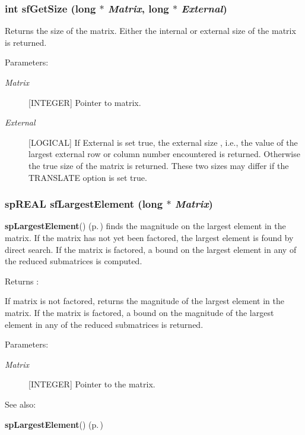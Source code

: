\subsubsection{\setlength{\rightskip}{0pt plus 5cm}int sf\-Get\-Size (long $\ast$ {\em Matrix}, long $\ast$ {\em External})}\label{spFortran_8c_a78}


Returns the size of the matrix. Either the internal or external size of the matrix is returned.\begin{Desc}
\item[Parameters: ]\par
\begin{description}
\item[{\em 
Matrix}][INTEGER] Pointer to matrix. \item[{\em 
External}][LOGICAL] If External is set true, the external size , i.e., the value of the largest external row or column number encountered is returned. Otherwise the true size of the matrix is returned. These two sizes may differ if the TRANSLATE option is set true. \end{description}
\end{Desc}
\subsubsection{\setlength{\rightskip}{0pt plus 5cm}sp\-REAL sf\-Largest\-Element (long $\ast$ {\em Matrix})}\label{spFortran_8c_a87}


{\bf sp\-Largest\-Element}() {\rm (p.\,\pageref{spUtils_8c_a22})} finds the magnitude on the largest element in the matrix. If the matrix has not yet been factored, the largest element is found by direct search. If the matrix is factored, a bound on the largest element in any of the reduced submatrices is computed.

\begin{Desc}
\item[Returns :]\par
[REAL or DOUBLE PRECISION] If matrix is not factored, returns the magnitude of the largest element in the matrix. If the matrix is factored, a bound on the magnitude of the largest element in any of the reduced submatrices is returned.\end{Desc}
\begin{Desc}
\item[Parameters: ]\par
\begin{description}
\item[{\em 
Matrix}][INTEGER] Pointer to the matrix.\end{description}
\end{Desc}
\begin{Desc}
\item[See also: ]\par
{\bf sp\-Largest\-Element}() {\rm (p.\,\pageref{spUtils_8c_a22})} \end{Desc}
